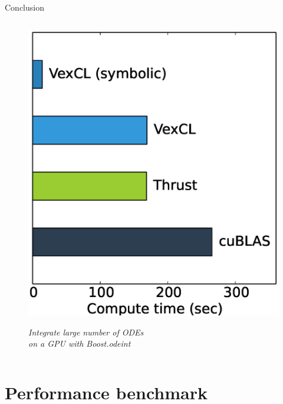 \documentclass[@BEAMER_OPTIONS@]{beamer}
\begin{document}
\begin{frame}[label=conclusion]{Conclusion}
\begin{columns}
\begin{column}{0.45\textwidth}
\begin{figure}
\begin{center}
                \includegraphics[width=\textwidth]{perfplot}

                \vspace{\baselineskip}
                {\small \sl
                    Integrate large number of ODEs\\
                    on a GPU with Boost.odeint
                }
            \end{center}
            \end{figure}
        \end{column}
    \end{columns}

\end{frame}

\note{}

\appendix

\section{Performance benchmark}
\begin{frame}
    \sectionpage
\end{frame}
\end{document}
